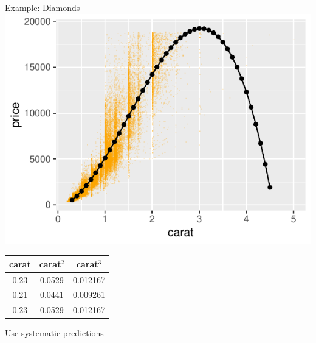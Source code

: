 \documentclass[
    utf8,
    aspectratio=169
]{beamer}  %
\begin{document}
\begin{frame}
\begin{columns}
		\begin{block}{\centering Example: Diamonds}
			\includegraphics[width=1\textwidth]{pics/nonlinear.pdf}
			\vspace{-9em}
			\begin{scriptsize}
				\begin{table}
					\raggedleft
					\begin{tabular}{ccc}
						carat & carat$^2$ & carat$^3$ \\
								\hline
						 0.23       &            0.0529       &          0.012167\\
						 0.21       &            0.0441       &          0.009261\\
						 0.23       &            0.0529       &          0.012167\\
					\hline
					\end{tabular}
				\end{table}
			\end{scriptsize}
			\vspace{3em}
			\centering Use systematic predictions
		\end{block}
	\end{columns}
\end{frame}
\end{document}
